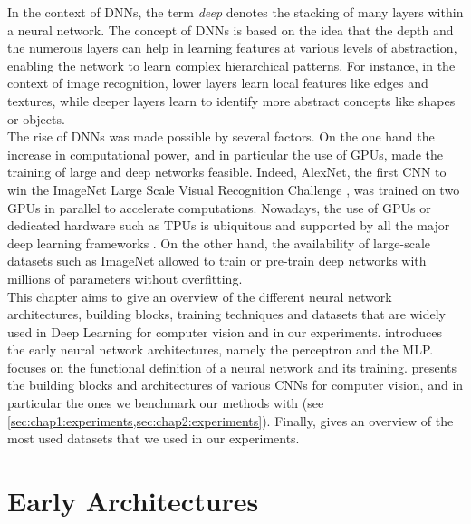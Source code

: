 In the context of \acp{DNN}, the term \emph{deep} denotes the stacking of many
layers within a neural network. The concept of \acp{DNN} is based on the idea
that the depth and the numerous layers can help in learning features at various
levels of abstraction, enabling the network to learn complex hierarchical
patterns. For instance, in the context of image recognition, lower layers learn
local features like edges and textures, while deeper layers learn to identify
more abstract concepts like shapes or objects.\\

The rise of \acp{DNN} was made possible by several factors. On the one hand the
increase in computational power, and in particular the use of \acp{GPU}, made
the training of large and deep networks feasible. Indeed, AlexNet, the first
\ac{CNN} to win the ImageNet Large Scale Visual Recognition Challenge
\cite{DBLP:conf/nips/KrizhevskySH12}, was trained on two \acp{GPU} in parallel
to accelerate computations. Nowadays, the use of \acp{GPU} or dedicated hardware
such as \acp{TPU} \cite{jouppi2017datacenter} is ubiquitous and supported by all
the major deep learning frameworks
\cite{DBLP:journals/corr/AbadiABBCCCDDDG16,DBLP:conf/nips/PaszkeGMLBCKLGA19}. On
the other hand, the availability of large-scale datasets such as ImageNet
\cite{deng2009imagenet} allowed to train or pre-train deep networks with
millions of parameters without overfitting.\\

This chapter aims to give an overview of the different neural network
architectures, building blocks, training techniques and datasets that are widely
used in Deep Learning for computer vision and in our experiments.
 introduces the early neural network
architectures, namely the perceptron and the \ac{MLP}. 
focuses on the functional definition of a neural network and its training.
 presents the building blocks and architectures of various
\acp{CNN} for computer vision, and in particular the ones we benchmark our
methods with (see \cref{sec:chap1:experiments,sec:chap2:experiments}). Finally,
 gives an overview of the most used datasets that we used
in our experiments.


\section{Early Architectures}\label{sec:dlo:early_architectures}

